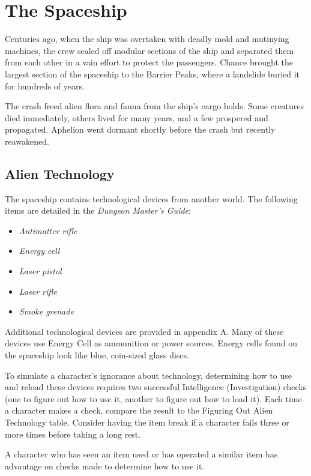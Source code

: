\documentclass[10pt,a4paper,twoside,bg=print,twocolumn,openany,nodeprecatedcode]{dndbook}
\begin{document}
\section{The Spaceship}
Centuries ago, when the ship was overtaken with deadly mold and mutinying machines, the crew sealed off modular sections of the ship and separated them from each other in a vain effort to protect the passengers. Chance brought the largest section of the spaceship to the Barrier Peaks, where a landslide buried it for hundreds of years.

The crash freed alien flora and fauna from the ship's cargo holds. Some creatures died immediately, others lived for many years, and a few prospered and propagated. Aphelion went dormant shortly before the crash but recently reawakened.

\subsection{Alien Technology}
The spaceship contains technological devices from another world. The following items are detailed in the \textit{Dungeon Master's Guide}:


\begin{itemize}
\item \textit{Antimatter rifle}
\item \textit{Energy cell}
\item \textit{Laser pistol}
\item \textit{Laser rifle}
\item \textit{Smoke grenade}
\end{itemize}

Additional technological devices are provided in appendix A. Many of these devices use Energy Cell as ammunition or power sources. Energy cells found on the spaceship look like blue, coin-sized glass discs.

To simulate a character's ignorance about technology, determining how to use and reload these devices requires two successful Intelligence (Investigation) checks (one to figure out how to use it, another to figure out how to load it). Each time a character makes a check, compare the result to the Figuring Out Alien Technology table. Consider having the item break if a character fails three or more times before taking a long rest.

A character who has seen an item used or has operated a similar item has advantage on checks made to determine how to use it.
\end{document}
